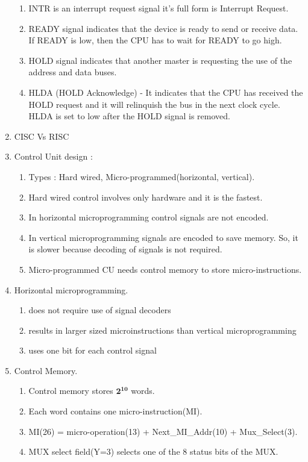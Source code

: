 \begin{enumerate}
\begin{enumerate}
        \item INTR is an interrupt request signal it's full form is Interrupt Request.

        \item READY signal indicates that the device is ready to send or receive data.
              If READY is low, then the CPU has to wait for READY to go high.

        \item HOLD signal indicates that another master is requesting the use of the address and data buses.

        \item HLDA (HOLD Acknowledge) - It indicates that the CPU has received the HOLD request and it will
              relinquish the bus in the next clock cycle. HLDA is set to low after the HOLD signal is removed.

    \end{enumerate}

    \item CISC Vs RISC

    \item Control Unit design :
    \begin{enumerate}
      \item Types : Hard wired, Micro-programmed(horizontal, vertical).
      \item Hard wired control involves only hardware and it is the fastest.
      \item In horizontal microprogramming control signals are not encoded.
      \item In vertical microprogramming signals are encoded to save memory. So, it is slower because
            decoding of signals is not required.
      \item Micro-programmed CU needs control memory to store micro-instructions.
    \end{enumerate}

    \item Horizontal microprogramming.
      \begin{enumerate}
      \item does not require use of signal decoders
      \item results in larger sized microinstructions than vertical microprogramming
      \item uses one bit for each control signal
      \end{enumerate}

    \item Control Memory.
    \begin{enumerate}
      \item Control memory stores \( \mathbf { 2^{10} } \) words.
      \item Each word contains one micro-instruction(MI).
      \item MI(26) = micro-operation(13) + Next\_MI\_Addr(10) + Mux\_Select(3).
      \item MUX select field(Y=3) selects one of the 8 status bits of the MUX.


\end{enumerate}
\end{enumerate}
